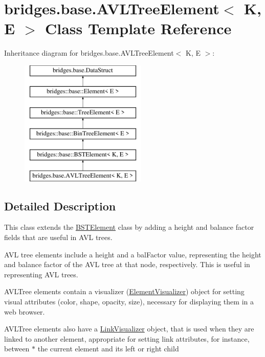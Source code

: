 \hypertarget{classbridges_1_1base_1_1_a_v_l_tree_element}{}\section{bridges.\+base.\+A\+V\+L\+Tree\+Element$<$ K, E $>$ Class Template Reference}
\label{classbridges_1_1base_1_1_a_v_l_tree_element}
Inheritance diagram for bridges.\+base.\+A\+V\+L\+Tree\+Element$<$ K, E $>$\+:\begin{figure}[H]
\begin{center}
\leavevmode
\includegraphics[height=6.000000cm]{classbridges_1_1base_1_1_a_v_l_tree_element}
\end{center}
\end{figure}


\subsection{Detailed Description}
This class extends the \hyperlink{classbridges_1_1base_1_1_b_s_t_element}{B\+S\+T\+Element} class by adding a height and balance factor fields that are useful in A\+VL trees. 

A\+VL tree elements include a \textquotesingle{}height\textquotesingle{} and a \textquotesingle{}bal\+Factor\textquotesingle{} value, representing the height and balance factor of the A\+VL tree at that node, respectively. This is useful in representing A\+VL trees.

A\+V\+L\+Tree elements contain a visualizer (\hyperlink{classbridges_1_1base_1_1_element_visualizer}{Element\+Visualizer}) object for setting visual attributes (color, shape, opacity, size), necessary for displaying them in a web browser.

A\+V\+L\+Tree elements also have a \hyperlink{classbridges_1_1base_1_1_link_visualizer}{Link\+Visualizer} object, that is used when they are linked to another element, appropriate for setting link attributes, for instance, between $\ast$ the current element and its left or right child


